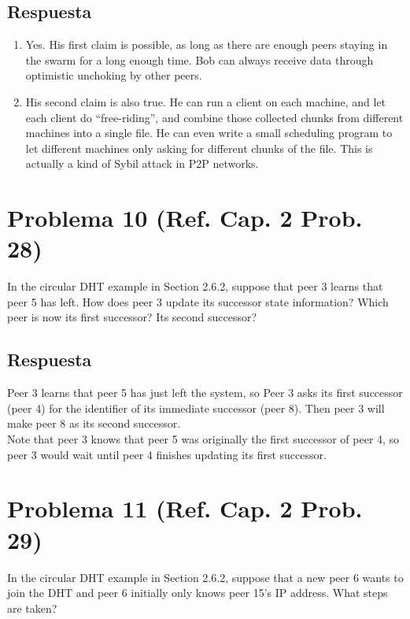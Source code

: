 \documentclass[10pt,spanish]{article}
\numberwithin{figure}{section} %
\begin{document}
\subsection*{Respuesta}

\begin{enumerate}
\item Yes. His first claim is possible, as long as there are enough peers staying in the swarm for a long enough time. Bob can always receive data through optimistic unchoking by other peers.
\item His second claim is also true. He can run a client on each machine, and let each client do ``free-riding'', and combine those collected chunks from different machines into a single file. He can even write a small scheduling program to let different machines only asking for different chunks of the file. This is actually a kind of Sybil attack in P2P networks.
\end{enumerate}

\section[Problema 10]{Problema 10 \textnormal{\Large{(Ref. Cap. 2 Prob. 28)}}}

In the circular DHT example in Section 2.6.2, suppose that peer 3 learns that peer 5 has left. How does peer 3 update its successor state information? Which peer is now its first successor? Its second successor?

\subsection*{Respuesta}

Peer 3 learns that peer 5 has just left the system, so Peer 3 asks its first successor (peer 4) for the identifier of its immediate successor (peer 8). Then peer 3 will make peer 8 as its second successor.\\
Note that peer 3 knows that peer 5 was originally the first successor of peer 4, so peer 3 would wait until peer 4 finishes updating its first successor.

\section[Problema 11]{Problema 11 \textnormal{\Large{(Ref. Cap. 2 Prob. 29)}}}

In the circular DHT example in Section 2.6.2, suppose that a new peer 6 wants to join the DHT and peer 6 initially only knows peer 15’s IP address. What steps are taken?
\end{document}
